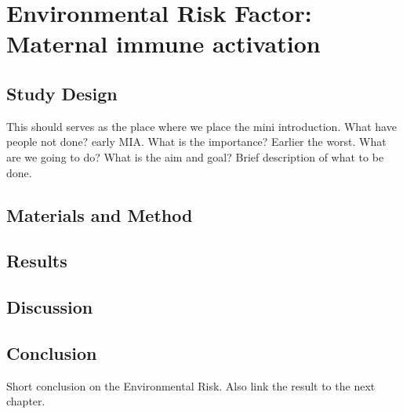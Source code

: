 \chapter[Environmental Risk Factor]{Environmental Risk Factor:\\ Maternal immune activation}
\section{Study Design}
This should serves as the place where we place the mini introduction.
What have people not done? early MIA. 
What is the importance? Earlier the worst.
What are we going to do?
What is the aim and goal?
Brief description of what to be done.
\section{Materials and Method}

\section{Results}

\section{Discussion}

\section{Conclusion}
Short conclusion on the Environmental Risk.
Also link the result to the next chapter.